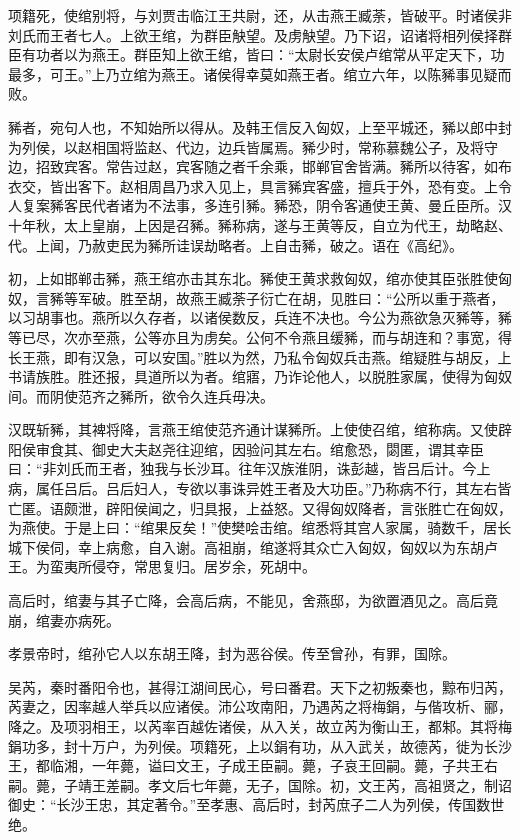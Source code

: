 \documentclass[12pt,UTF8]{ctexbook}
\begin{document}
项籍死，使绾别将，与刘贾击临江王共尉，还，从击燕王臧荼，皆破平。时诸侯非刘氏而王者七人。上欲王绾，为群臣觖望。及虏觖望。乃下诏，诏诸将相列侯择群臣有功者以为燕王。群臣知上欲王绾，皆曰：“太尉长安侯卢绾常从平定天下，功最多，可王。”上乃立绾为燕王。诸侯得幸莫如燕王者。绾立六年，以陈豨事见疑而败。



豨者，宛句人也，不知始所以得从。及韩王信反入匈奴，上至平城还，豨以郎中封为列侯，以赵相国将监赵、代边，边兵皆属焉。豨少时，常称慕魏公子，及将守边，招致宾客。常告过赵，宾客随之者千余乘，邯郸官舍皆满。豨所以待客，如布衣交，皆出客下。赵相周昌乃求入见上，具言豨宾客盛，擅兵于外，恐有变。上令人复案豨客民代者诸为不法事，多连引豨。豨恐，阴令客通使王黄、曼丘臣所。汉十年秋，太上皇崩，上因是召豨。豨称病，遂与王黄等反，自立为代王，劫略赵、代。上闻，乃赦吏民为豨所诖误劫略者。上自击豨，破之。语在《高纪》。



初，上如邯郸击豨，燕王绾亦击其东北。豨使王黄求救匈奴，绾亦使其臣张胜使匈奴，言豨等军破。胜至胡，故燕王臧荼子衍亡在胡，见胜曰：“公所以重于燕者，以习胡事也。燕所以久存者，以诸侯数反，兵连不决也。今公为燕欲急灭豨等，豨等已尽，次亦至燕，公等亦且为虏矣。公何不令燕且缓豨，而与胡连和？事宽，得长王燕，即有汉急，可以安国。”胜以为然，乃私令匈奴兵击燕。绾疑胜与胡反，上书请族胜。胜还报，具道所以为者。绾寤，乃诈论他人，以脱胜家属，使得为匈奴间。而阴使范齐之豨所，欲令久连兵毋决。



汉既斩豨，其裨将降，言燕王绾使范齐通计谋豨所。上使使召绾，绾称病。又使辟阳侯审食其、御史大夫赵尧往迎绾，因验问其左右。绾愈恐，閟匿，谓其幸臣曰：“非刘氏而王者，独我与长沙耳。往年汉族淮阴，诛彭越，皆吕后计。今上病，属任吕后。吕后妇人，专欲以事诛异姓王者及大功臣。”乃称病不行，其左右皆亡匿。语颇泄，辟阳侯闻之，归具报，上益怒。又得匈奴降者，言张胜亡在匈奴，为燕使。于是上曰：“绾果反矣！”使樊哙击绾。绾悉将其宫人家属，骑数千，居长城下侯伺，幸上病愈，自入谢。高祖崩，绾遂将其众亡入匈奴，匈奴以为东胡卢王。为蛮夷所侵夺，常思复归。居岁余，死胡中。



高后时，绾妻与其子亡降，会高后病，不能见，舍燕邸，为欲置酒见之。高后竟崩，绾妻亦病死。



孝景帝时，绾孙它人以东胡王降，封为恶谷侯。传至曾孙，有罪，国除。



吴芮，秦时番阳令也，甚得江湖间民心，号曰番君。天下之初叛秦也，黥布归芮，芮妻之，因率越人举兵以应诸侯。沛公攻南阳，乃遇芮之将梅鋗，与偕攻析、郦，降之。及项羽相王，以芮率百越佐诸侯，从入关，故立芮为衡山王，都邾。其将梅鋗功多，封十万户，为列侯。项籍死，上以鋗有功，从入武关，故德芮，徙为长沙王，都临湘，一年薨，谥曰文王，子成王臣嗣。薨，子哀王回嗣。薨，子共王右嗣。薨，子靖王差嗣。孝文后七年薨，无子，国除。初，文王芮，高祖贤之，制诏御史：“长沙王忠，其定著令。”至孝惠、高后时，封芮庶子二人为列侯，传国数世绝。
\end{document}
